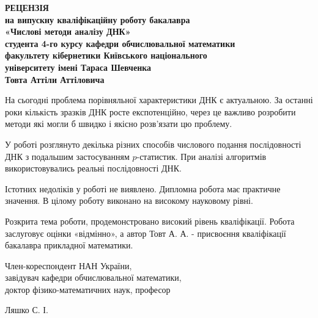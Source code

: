 \documentclass[14pt,a4paper,titlepage]{extarticle}
\begin{document}
\begin{center}
\textbf{РЕЦЕНЗІЯ \\[0.7cm]
на випускну кваліфікаційну роботу бакалавра \\
«Числові методи аналізу ДНК» \\
студента 4-го курсу кафедри обчислювальної математики \\
факультету кібернетики Київського національного \\
університету імені Тараса Шевченка \\
Товта Аттіли Аттіловича
}
\end{center}
На сьогодні проблема порівняльної характеристики ДНК є актуальною. За останні роки кількість зразків ДНК росте експотенційно, через це важливо розробити методи які могли б швидко і якісно розв’язати цю проблему.
\par
У роботі розглянуто декілька  різних способів числового подання послідовності ДНК з подальшим застосуванням $p$-статистик. При аналізі алгоритмів використовувались реальні послідовності ДНК.
\par
Істотних недоліків у роботі не виявлено. Дипломна робота має практичне значення. В цілому роботу виконано на високому науковому рівні.
\par
Розкрита тема роботи, продемонстровано високий рівень кваліфікації. Робота заслуговує оцінки «відмінно», а автор Товт А. А. - присвоєння кваліфікації бакалавра прикладної математики.

\vfill

\begin{minipage}[t]{11cm}
\flushleft
Член-кореспондент НАН України, \\
завідувач кафедри обчислювальної математики, \\
доктор фізико-математичних наук, професор
\end{minipage}
\begin{minipage}[t]{6cm}
\hfill
\flushright
Ляшко С. І.
\end{minipage}
\end{document}
